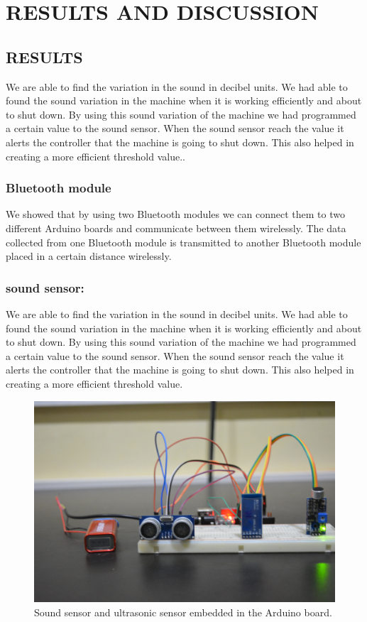 \chapter{RESULTS AND DISCUSSION}
\section{RESULTS}
We are able to find the variation in the sound in decibel units. We had able to found the sound variation in the machine when it is working efficiently and about to shut down. By using this sound variation of the machine we had programmed a certain value to the sound sensor. When the sound sensor reach the value it alerts the controller that the machine is going to shut down. This also helped in creating a more efficient threshold value..
\subsection{Bluetooth module}
We showed that by using two Bluetooth modules we can connect them to two different Arduino boards and communicate between them wirelessly. The data collected from one Bluetooth module is transmitted to another Bluetooth module placed in a certain distance wirelessly.
\subsection{sound sensor:}
We are able to find the variation in the sound in decibel units. We had able to found the sound variation in the machine when it is working efficiently and about to shut down. By using this sound variation of the machine we had programmed a certain value to the sound sensor. When the sound sensor reach the value it alerts the controller that the machine is going to shut down. This also helped in creating a more efficient threshold value.


\newpage
\begin{figure}[h]
\centerline{\includegraphics[width=5.7in]{uc}}
\caption{ Sound sensor and ultrasonic sensor embedded in the Arduino board.}
\end{figure}
